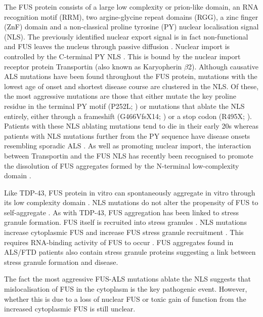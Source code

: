 The FUS protein consists of a large low complexity or prion-like domain, an RNA recognition motif (RRM), two argine-glycine repeat domains (RGG), a zinc finger (ZnF) domain and a  non-classical proline tyrosine (PY) nuclear localisation signal (NLS). 
The previously identified nuclear export signal is in fact non-functional and FUS leaves the nucleus through passive diffusion \citep{Ederle2018}. 
Nuclear import is controlled by the C-terminal PY NLS \citep{Dormann2010}. 
This is bound by the nuclear import receptor protein Transportin (also known as Karyopherin $\beta$2).
Although causative ALS mutations have been found throughout the FUS protein, mutations with the lowest age of onset and shortest disease course are clustered in the NLS. 
Of these, the most aggressive mutations are those that either mutate the key proline residue in the terminal PY motif (P252L; \citep{Chio2009}) or mutations that ablate the NLS entirely, either through a frameshift (G466VfsX14; \citep{DeJesus-Hernandez2010}) or a stop codon (R495X; \citep{Bosco2010}). 
Patients with these NLS ablating mutations tend to die in their early 20s whereas patients with NLS mutations further from the PY sequence have disease onsets resembling sporadic ALS \citep{Shang2016}.
As well as promoting nuclear import, the interaction between Transportin and the FUS NLS has recently been recognised to promote the dissolution of FUS aggregates formed by the N-terminal low-complexity domain \citep{Guo2018, Yoshizawa2018}.

Like TDP-43, FUS protein in vitro can spontaneously aggregate in vitro through its low complexity domain \citep{Murray2017}. 
NLS mutations do not alter the propensity of FUS to self-aggregate \citep{Sun2011}.
As with TDP-43, FUS aggregation has been linked to stress granule formation.
FUS itself is recruited into stress granules \citep{Andersson2008,Yasuda2013}. 
NLS mutations increase cytoplasmic FUS and increase FUS stress granule recruitment \citep{Dormann2010, Bosco2010}.
This requires RNA-binding activity of FUS to occur \citep{Daigle2013} .
FUS aggregates found in ALS/FTD patients also contain stress granule proteins \citep{Dormann2010} suggesting a link between stress granule formation and disease.




The fact the most aggressive FUS-ALS mutations ablate the NLS suggests that mislocalisation of FUS in the cytoplasm is the key pathogenic event. However, whether this is due to a loss of nuclear FUS or toxic gain of function from the increased cytoplasmic FUS is still unclear.


